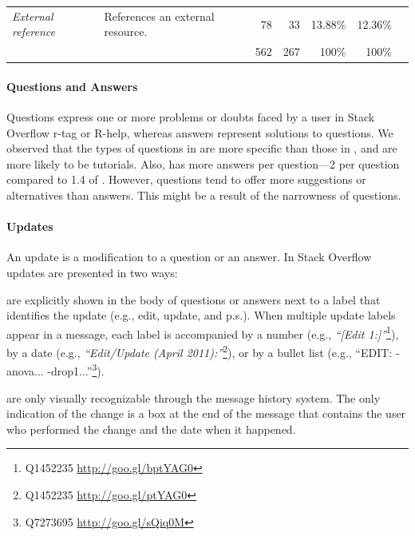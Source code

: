 \begin{table}[!htb]
\begin{small}
\begin{tabular}[h]{p{2.3cm}p{10.3cm}rrrrr}
  \emph{External reference}     & References an external resource.                                                                                                                         & 78           & 33               & 13.88\%        & 12.36\%        \\\cline{3-6}
                                &                                                                                                                                                          &{562}  & {267}     & {100\%} & {100\%} \\
  \bottomrule
        \end{tabular}
      \end{small}
      \label{table:type-of-knowledge}
\vspace{-3mm}
    \end{table}

\paragraph*{Questions and Answers}
    Questions express one or more problems or doubts faced by a user in Stack Overflow r-tag or R-help, whereas answers represent solutions to questions.  We observed that the types of questions in \SO are more specific than those in \RH, and are more likely to be tutorials. Also, \SO has more answers per question---2 per question compared to 1.4 of \RH. However, \RH questions tend to offer more suggestions or alternatives than \SO answers. This might be a result of the narrowness of \SO questions.

\paragraph*{Updates}
An update is a modification to a question or an answer. 
In Stack Overflow updates are presented in two ways:
\begin{description}[itemsep=3pt, topsep=2pt, leftmargin=1em, parsep=0pt]
\item[Labelled updates] are explicitly shown in the body of questions or answers next to a label that identifies the update (e.g., edit, update, and p.s.).
  When multiple update labels appear in a message, each label is accompanied by a number (e.g., \textit{``[Edit 1:]''}\footnote{Q1452235
    \url{http://goo.gl/bptYAG0}}), by a date (e.g., \textit{``Edit/Update (April 2011):''}\footnote{Q1452235 \url{http://goo.gl/ptYAG0}}), or by a bullet list
  (e.g., ``EDIT: - anova... -drop1...''\footnote{Q7273695 \url{http://goo.gl/sQiq0M}}).

\item[Non-labelled updates] are only visually recognizable through the message history system. The only indication of the change is a box at the end of the
  message that contains the user who performed the change and the date when it happened.
\end{description}

